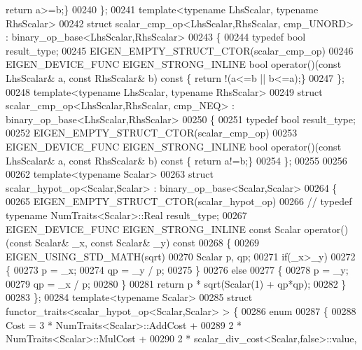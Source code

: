 \begin{DoxyCode}
{      return} a>=b;\}
00240 \};
00241 \textcolor{keyword}{template}<\textcolor{keyword}{typename} LhsScalar, \textcolor{keyword}{typename} RhsScalar>
00242 \textcolor{keyword}{struct }scalar\_cmp\_op<LhsScalar,RhsScalar, cmp\_UNORD> : binary\_op\_base<LhsScalar,RhsScalar>
00243 \{
00244   \textcolor{keyword}{typedef} \textcolor{keywordtype}{bool} result\_type;
00245   EIGEN\_EMPTY\_STRUCT\_CTOR(scalar\_cmp\_op)
00246   EIGEN\_DEVICE\_FUNC EIGEN\_STRONG\_INLINE \textcolor{keywordtype}{bool} operator()(\textcolor{keyword}{const} LhsScalar& a, \textcolor{keyword}{const} RhsScalar& b)\textcolor{keyword}{ const }\{\textcolor{keywordflow}{
      return} !(a<=b || b<=a);\}
00247 \};
00248 \textcolor{keyword}{template}<\textcolor{keyword}{typename} LhsScalar, \textcolor{keyword}{typename} RhsScalar>
00249 \textcolor{keyword}{struct }scalar\_cmp\_op<LhsScalar,RhsScalar, cmp\_NEQ> : binary\_op\_base<LhsScalar,RhsScalar>
00250 \{
00251   \textcolor{keyword}{typedef} \textcolor{keywordtype}{bool} result\_type;
00252   EIGEN\_EMPTY\_STRUCT\_CTOR(scalar\_cmp\_op)
00253   EIGEN\_DEVICE\_FUNC EIGEN\_STRONG\_INLINE \textcolor{keywordtype}{bool} operator()(\textcolor{keyword}{const} LhsScalar& a, \textcolor{keyword}{const} RhsScalar& b)\textcolor{keyword}{ const }\{\textcolor{keywordflow}{
      return} a!=b;\}
00254 \};
00255 
00256 
00262 \textcolor{keyword}{template}<\textcolor{keyword}{typename} Scalar>
00263 \textcolor{keyword}{struct }scalar\_hypot\_op<Scalar,Scalar> : binary\_op\_base<Scalar,Scalar>
00264 \{
00265   EIGEN\_EMPTY\_STRUCT\_CTOR(scalar\_hypot\_op)
00266 \textcolor{comment}{//   typedef typename NumTraits<Scalar>::Real result\_type;}
00267   EIGEN\_DEVICE\_FUNC EIGEN\_STRONG\_INLINE \textcolor{keyword}{const} Scalar operator() (\textcolor{keyword}{const} Scalar& \_x, \textcolor{keyword}{const} Scalar& \_y)\textcolor{keyword}{ const}
00268 \textcolor{keyword}{  }\{
00269     EIGEN\_USING\_STD\_MATH(sqrt)
00270     Scalar p, qp;
00271     \textcolor{keywordflow}{if}(\_x>\_y)
00272     \{
00273       p = \_x;
00274       qp = \_y / p;
00275     \}
00276     \textcolor{keywordflow}{else}
00277     \{
00278       p = \_y;
00279       qp = \_x / p;
00280     \}
00281     \textcolor{keywordflow}{return} p * sqrt(Scalar(1) + qp*qp);
00282   \}
00283 \};
00284 \textcolor{keyword}{template}<\textcolor{keyword}{typename} Scalar>
00285 \textcolor{keyword}{struct }functor\_traits<scalar\_hypot\_op<Scalar,Scalar> > \{
00286   \textcolor{keyword}{enum}
00287   \{
00288     Cost = 3 * NumTraits<Scalar>::AddCost +
00289            2 * NumTraits<Scalar>::MulCost +
00290            2 * scalar\_div\_cost<Scalar,false>::value,

\end{DoxyCode}
